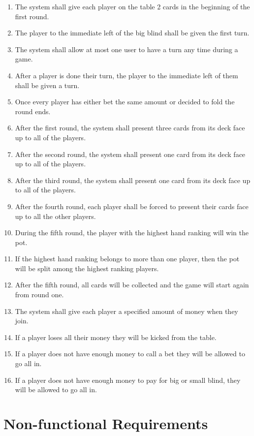 \documentclass[12pt, titlepage]{article}
\begin{document}
\begin{enumerate}[label=FR\arabic*.]
        \item The system shall give each player on the table 2 cards in the beginning of the first round.
        \item The player to the immediate left of the big blind shall be given the first turn.
        \item The system shall allow at most one user to have a turn any time during a game.
        \item After a player is done their turn, the player to the immediate left of them shall be given a turn.
        \item Once every player has either bet the same amount or decided to fold the round ends.
        \item After the first round, the system shall present three cards from its deck face up to all of the players.
        \item After the second round, the system shall present one card from its deck face up to all of the players.
        \item After the third round, the system shall present one card from its deck face up to all of the players.
        \item After the fourth round, each player shall be forced to present their cards face up to all the other players.
        \item During the fifth round, the player with the highest hand ranking will win the pot.
        \item If the highest hand ranking belongs to more than one player, then the pot will be split among the highest ranking players.
        \item After the fifth round, all cards will be collected and the game will start again from round one.
        \item The system shall give each player a specified amount of money when they join.
        \item If a player loses all their money they will be kicked from the table.
        \item If a player does not have enough money to call a bet they will be allowed to go all in.
        \item If a player does not have enough money to pay for big or small blind, they will be allowed to go all in.
        
    \end{enumerate}
\section{Non-functional Requirements}
\end{document}
